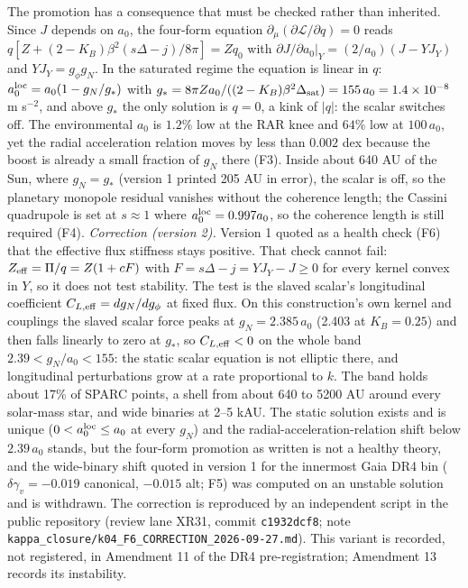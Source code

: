 \documentclass[11pt,letterpaper]{article}
\begin{document}
The promotion has a consequence that must be checked rather than inherited. Since $J$ depends on $a_0$, the four-form equation $\partial_\mu(\partial\mathcal L/\partial q)=0$ reads $q[Z+(2-K_B)\beta^2(s\Delta-j)/8\pi]=Zq_0$ with $\partial J/\partial a_0|_Y=(2/a_0)(J-YJ_Y)$ and $YJ_Y=g_\phi g_N$. In the saturated regime the equation is linear in $q$: $a_0^{\rm loc}=a_0(1-g_N/g_*)$ with $g_*=8\pi Za_0/((2-K_B)\beta^2\Delta_{\rm sat})=155\,a_0=1.4\times10^{-8}$ m s$^{-2}$, and above $g_*$ the only solution is $q=0$, a kink of $|q|$: the scalar switches off. The environmental $a_0$ is $1.2\%$ low at the RAR knee and $64\%$ low at $100\,a_0$, yet the radial acceleration relation moves by less than $0.002$ dex because the boost is already a small fraction of $g_N$ there (F3). Inside about 640 AU of the Sun, where $g_N=g_*$ (version 1 printed 205 AU in error), the scalar is off, so the planetary monopole residual vanishes without the coherence length; the Cassini quadrupole is set at $s\approx1$ where $a_0^{\rm loc}=0.997a_0$, so the coherence length is still required (F4). \emph{Correction (version 2).} Version 1 quoted as a health check (F6) that the effective flux stiffness stays positive. That check cannot fail: $Z_{\rm eff}=\Pi/q=Z(1+cF)$ with $F=s\Delta-j=YJ_Y-J\ge0$ for every kernel convex in $Y$, so it does not test stability. The test is the slaved scalar's longitudinal coefficient $C_{L,\rm eff}=dg_N/dg_\phi$ at fixed flux. On this construction's own kernel and couplings the slaved scalar force peaks at $g_N=2.385\,a_0$ (2.403 at $K_B=0.25$) and then falls linearly to zero at $g_*$, so $C_{L,\rm eff}<0$ on the whole band $2.39<g_N/a_0<155$: the static scalar equation is not elliptic there, and longitudinal perturbations grow at a rate proportional to $k$. The band holds about 17\% of SPARC points, a shell from about 640 to 5200 AU around every solar-mass star, and wide binaries at 2--5 kAU. The static solution exists and is unique ($0<a_0^{\rm loc}\le a_0$ at every $g_N$) and the radial-acceleration-relation shift below $2.39\,a_0$ stands, but the four-form promotion as written is not a healthy theory, and the wide-binary shift quoted in version 1 for the innermost Gaia DR4 bin ($\delta\gamma_v=-0.019$ canonical, $-0.015$ alt; F5) was computed on an unstable solution and is withdrawn. The correction is reproduced by an independent script in the public repository (review lane XR31, commit \texttt{c1932dcf8}; note \texttt{kappa\_closure/k04\_F6\_CORRECTION\_2026-09-27.md}). This variant is recorded, not registered, in Amendment 11 of the DR4 pre-registration; Amendment 13 records its instability.
\end{document}
